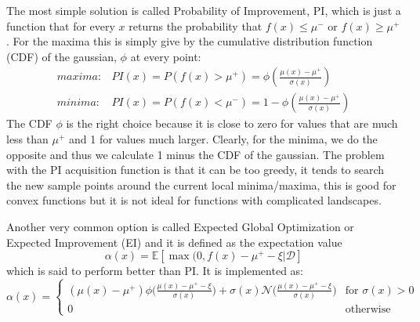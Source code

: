 \documentclass{article}
\begin{document}
The most simple solution is called Probability of Improvement, PI, which is just a function that for every $x$ returns the probability that $f(x) \leq \mu^-$ or $f(x) \geq \mu^+$. For the maxima this is simply give by the cumulative distribution function (CDF) of the gaussian, $\phi$ at every point:
\begin{align}
    maxima: &PI(x) = P(f(x) > \mu^+) = \phi(\frac{\mu(x) - \mu^+}{\sigma(x)}) \\
    minima: &PI(x) = P(f(x) < \mu^-) = 1 - \phi(\frac{\mu(x) - \mu^+}{\sigma(x)})
\end{align}
The CDF $\phi$ is the right choice because it is close to zero for values that are much less than $\mu^+$ and 1 for values much larger. Clearly, for the minima, we do the opposite and thus we calculate 1 minus the CDF of the gaussian. 
The problem with the PI acquisition function is that it can be too greedy, it tends to search the new sample points around the current local minima/maxima, this is good for convex functions but it is not ideal for functions with complicated landscapes. 

Another very common option is called Expected Global Optimization or Expected Improvement (EI) and it is defined as the expectation value 
\begin{equation}
    \alpha(x) = \mathbb{E}[\max (0, f(x) - \mu^+ - \xi | \mathcal{D}]
\end{equation}
which is said to perform better than PI. It is implemented as:
\begin{equation}
    \alpha(x) = 
    \begin{cases}
        (\mu(x) - \mu^+) \phi \big( \frac{\mu(x) - \mu^+ - \xi}{\sigma(x)} \big) + \sigma(x) \mathcal{N}\big(\frac{\mu(x) - \mu^+ - \xi}{\sigma(x)}\big) & \text{for }\sigma(x) >0 \\    
        0 & \text{otherwise}   
    \end{cases}
\end{equation}
\end{document}
